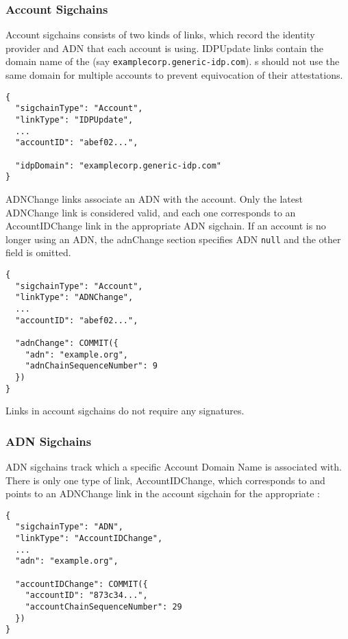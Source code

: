 \subsubsection{Account Sigchains}

Account sigchains consists of two kinds of links, which record the identity provider and ADN that
each account is using. \textsf{IDPUpdate} links contain the domain name of the \idp (say
\texttt{examplecorp.generic-idp.com}). {\idp}s should not use the same domain for multiple accounts to prevent equivocation of their attestations.

\begingroup{}
\fontsize{10pt}{12pt}\selectfont{}
\begin{verbatim}
{
  "sigchainType": "Account",
  "linkType": "IDPUpdate",
  ...
  "accountID": "abef02...",

  "idpDomain": "examplecorp.generic-idp.com"
}
\end{verbatim}
\endgroup{}

\textsf{ADNChange} links associate an ADN with the account. Only the latest \textsf{ADNChange} link
is considered valid, and each one corresponds to an \textsf{AccountIDChange} link in the appropriate
ADN sigchain. If an account is no longer using an ADN, the \textsf{adnChange} section specifies ADN
\texttt{null} and the other field is omitted.

\begingroup{}
\fontsize{10pt}{12pt}\selectfont{}
\begin{verbatim}
{
  "sigchainType": "Account",
  "linkType": "ADNChange",
  ...
  "accountID": "abef02...",

  "adnChange": COMMIT({
    "adn": "example.org",
    "adnChainSequenceNumber": 9
  })
}
\end{verbatim}
\endgroup{}

Links in account sigchains do not require any signatures.

\subsubsection{ADN Sigchains}

ADN sigchains track which \accountID a specific Account Domain Name is associated with. There is
only one type of link, \textsf{AccountIDChange}, which corresponds to and points to an
\textsf{ADNChange} link in the account sigchain for the appropriate \accountID:

\begingroup{}
\fontsize{10pt}{12pt}\selectfont{}
\begin{verbatim}
{
  "sigchainType": "ADN",
  "linkType": "AccountIDChange",
  ...
  "adn": "example.org",

  "accountIDChange": COMMIT({
    "accountID": "873c34...",
    "accountChainSequenceNumber": 29
  })
}
\end{verbatim}
\endgroup{}

